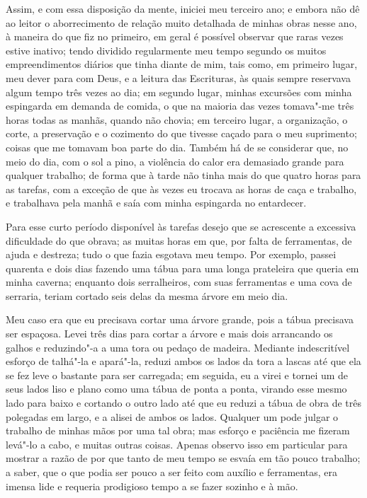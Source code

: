 Assim, e com essa disposição da mente, iniciei meu terceiro ano; e
embora não dê ao leitor o aborrecimento de relação muito detalhada de
minhas obras nesse ano, à maneira do que fiz no primeiro, em geral é
possível observar que raras vezes estive inativo; tendo dividido
regularmente meu tempo segundo os muitos empreendimentos diários que
tinha diante de mim, tais como, em primeiro lugar, meu dever para com
Deus, e a leitura das Escrituras, às quais sempre reservava algum tempo
três vezes ao dia; em segundo lugar, minhas excursões com minha
espingarda em demanda de comida, o que na maioria das vezes tomava"-me
três horas todas as manhãs, quando não chovia; em terceiro lugar, a
organização, o corte, a preservação e o cozimento do que tivesse caçado
para o meu suprimento; coisas que me tomavam boa parte do dia. Também há
de se considerar que, no meio do dia, com o sol a pino, a violência do
calor era demasiado grande para qualquer trabalho; de forma que à tarde
não tinha mais do que quatro horas para as tarefas, com a exceção de que
às vezes eu trocava as horas de caça e trabalho, e trabalhava pela manhã
e saía com minha espingarda no entardecer.

Para esse curto período disponível às tarefas desejo que se acrescente a
excessiva dificuldade do que obrava; as muitas horas em que, por falta
de ferramentas, de ajuda e destreza; tudo o que fazia esgotava meu
tempo. Por exemplo, passei quarenta e dois dias fazendo uma tábua para
uma longa prateleira que queria em minha caverna; enquanto dois
serralheiros, com suas ferramentas e uma cova de serraria, teriam
cortado seis delas da mesma árvore em meio dia.

Meu caso era que eu precisava cortar uma árvore grande, pois a tábua
precisava ser espaçosa. Levei três dias para cortar a árvore e mais dois
arrancando os galhos e reduzindo"-a a uma tora ou pedaço de madeira.
Mediante indescritível esforço de talhá"-la e apará"-la, reduzi ambos os
lados da tora a lascas até que ela se fez leve o bastante para ser
carregada; em seguida, eu a virei e tornei um de seus lados liso e plano
como uma tábua de ponta a ponta, virando esse mesmo lado para baixo e
cortando o outro lado até que eu reduzi a tábua de obra de três
polegadas em largo, e a alisei de ambos os lados. Qualquer um pode
julgar o trabalho de minhas mãos por uma tal obra; mas esforço e
paciência me fizeram levá"-lo a cabo, e muitas outras coisas. Apenas
observo isso em particular para mostrar a razão de por que tanto de meu
tempo se esvaía em tão pouco trabalho; a saber, que o que podia ser
pouco a ser feito com auxílio e ferramentas, era imensa lide e requeria
prodigioso tempo a se fazer sozinho e à mão.

